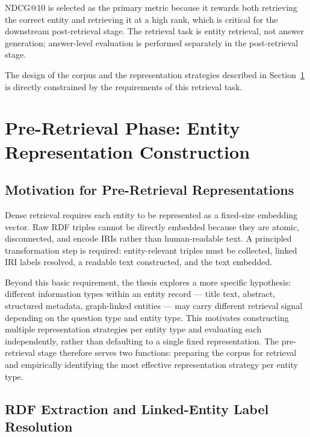 NDCG@10 is selected as the primary metric because it rewards both retrieving
the correct entity and retrieving it at a high rank, which is critical for the
downstream post-retrieval stage.
The retrieval task is entity retrieval, not answer generation; answer-level
evaluation is performed separately in the post-retrieval stage.

The design of the corpus and the representation strategies described in
Section~\ref{sec:preretrieval} is directly constrained by the requirements of
this retrieval task.

\section{Pre-Retrieval Phase: Entity Representation Construction}
\label{sec:preretrieval}

\subsection{Motivation for Pre-Retrieval Representations}
\label{subsec:preretrieval_motivation}

Dense retrieval requires each entity to be represented as a fixed-size
embedding vector.
Raw RDF triples cannot be directly embedded because they are atomic,
disconnected, and encode IRIs rather than human-readable text.
A principled transformation step is required: entity-relevant triples must
be collected, linked IRI labels resolved, a readable text constructed, and
the text embedded.

Beyond this basic requirement, the thesis explores a more specific hypothesis:
different information types within an entity record --- title text, abstract,
structured metadata, graph-linked entities --- may carry different retrieval
signal depending on the question type and entity type.
This motivates constructing multiple representation strategies per entity type
and evaluating each independently, rather than defaulting to a single fixed
representation.
The pre-retrieval stage therefore serves two functions: preparing the corpus
for retrieval and empirically identifying the most effective representation
strategy per entity type.

\subsection{RDF Extraction and Linked-Entity Label Resolution}
\label{subsec:rdf_extraction}


